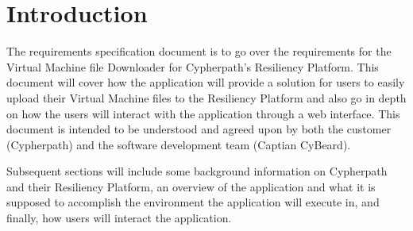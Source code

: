\documentclass{article}
\begin{document}
    

    \tableofcontents
    \listoffigures

    \newpage
    \begin{versionhistory}
    \end{versionhistory}
    \newpage

    \section{Introduction}
    The requirements specification document is to go over the requirements for the Virtual Machine file Downloader for Cypherpath's Resiliency Platform.
    This document will cover how the application will provide a solution for users to easily upload their Virtual Machine files to the Resiliency Platform and also
    go in depth on how the users will interact with the application through a web interface. This document is intended to be understood and agreed
    upon by both the customer (Cypherpath) and the software development team (Captian CyBeard).

    Subsequent sections will include some background information on Cypherpath and their Resiliency Platform, an overview of the application and what it
    is supposed to accomplish the environment the application will execute in, and finally, how users will interact the application.

    
\end{document}
